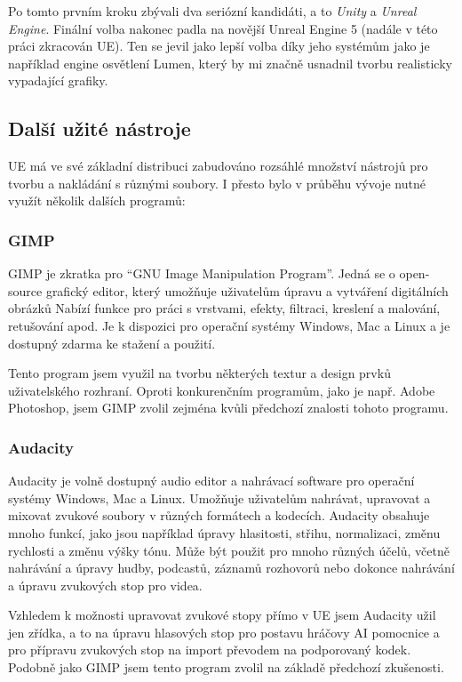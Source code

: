 \documentclass[12pt,a4paper,hidelinks]{article}
\begin{document}
Po tomto prvním kroku zbývali dva seriózní kandidáti, a to \textit{Unity}\cite{unity} a \textit{Unreal Engine}\cite{unreal}. Finální volba nakonec padla na novější Unreal Engine 5 (nadále v této práci zkracován UE). Ten se jevil jako lepší volba díky jeho systémům jako je například engine osvětlení Lumen\cite{uedocs:lumen}, který by mi značně usnadnil tvorbu realisticky vypadající grafiky.

\subsection{Další užité nástroje}
UE má ve své základní distribuci zabudováno rozsáhlé množství nástrojů pro tvorbu a nakládání s různými soubory. I přesto bylo v průběhu vývoje nutné využít několik dalších programů:

\subsubsection{GIMP}
GIMP je zkratka pro \enquote{GNU Image Manipulation Program}\cite{gimp}. Jedná se o open-source grafický editor, který umožňuje uživatelům úpravu a vytváření digitálních obrázků Nabízí funkce pro práci s vrstvami, efekty, filtraci, kreslení a malování, retušování apod. Je k dispozici pro operační systémy Windows, Mac a Linux a je dostupný zdarma ke stažení a použití.

Tento program jsem využil na tvorbu některých textur a design prvků uživatelského rozhraní. Oproti konkurenčním programům, jako je např. Adobe Photoshop\cite{photoshop}, jsem GIMP zvolil zejména kvůli předchozí znalosti tohoto programu.

\subsubsection{Audacity}
Audacity\cite{audacity} je volně dostupný audio editor a nahrávací software pro operační systémy Windows, Mac a Linux. Umožňuje uživatelům nahrávat, upravovat a mixovat zvukové soubory v různých formátech a kodecích. Audacity obsahuje mnoho funkcí, jako jsou například úpravy hlasitosti, střihu, normalizaci, změnu rychlosti a změnu výšky tónu. Může být použit pro mnoho různých účelů, včetně nahrávání a úpravy hudby, podcastů, záznamů rozhovorů nebo dokonce nahrávání a úpravu zvukových stop pro videa.

Vzhledem k možnosti upravovat zvukové stopy přímo v UE jsem Audacity užil jen zřídka, a to na úpravu hlasových stop pro postavu hráčovy AI pomocnice a pro přípravu zvukových stop na import převodem na podporovaný kodek. Podobně jako GIMP jsem tento program zvolil na základě předchozí zkušenosti.
\end{document}
